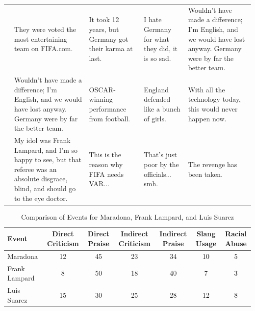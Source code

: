 \documentclass{article}
\begin{document}
\begin{table}[htbp]
\begin{adjustbox}{max width=\linewidth}
\begin{tabular}{|c|p{3.5cm}|p{3.5cm}|p{3.5cm}|p{3.5cm}|}
            & They were voted the most entertaining team on FIFA.com. & It took 12 years, but Germany got their karma at last. & I hate Germany for what they did, it is so sad. & Wouldn't have made a difference; I'm English, and we would have lost anyway. Germany were by far the better team. \\ 
            & Wouldn't have made a difference; I'm English, and we would have lost anyway. Germany were by far the better team. & OSCAR-winning performance from football. & England defended like a bunch of girls. & With all the technology today, this would never happen now. \\ 
            & My idol was Frank Lampard, and I'm so happy to see, but that referee was an absolute disgrace, blind, and should go to the eye doctor. & This is the reason why FIFA needs VAR... & That's just poor by the officials... smh. & The revenge has been taken. \\ 
            \hline
        \end{tabular}
    \end{adjustbox}
\end{table}




\begin{table}[htbp]
    \centering
    \caption{Comparison of Events for Maradona, Frank Lampard, and Luis Suarez}
    \label{tab:events}
    \renewcommand{\arraystretch}{1.2} %
    \begin{adjustbox}{max width=\linewidth} %
        \begin{tabular}{l c c c c c c} 
            \toprule
            \textbf{Event} & \textbf{Direct Criticism} & \textbf{Direct Praise} & \textbf{Indirect Criticism} & \textbf{Indirect Praise} & \textbf{Slang Usage} & \textbf{Racial Abuse} \\
            \midrule
            Maradona & 12 & 45 & 23 & 34 & 10 & 5 \\
            Frank Lampard & 8 & 50 & 18 & 40 & 7 & 3 \\
            Luis Suarez & 15 & 30 & 25 & 28 & 12 & 8 \\
            \bottomrule
        \end{tabular}
    \end{adjustbox}
\end{table}

\FloatBarrier %
\end{document}

